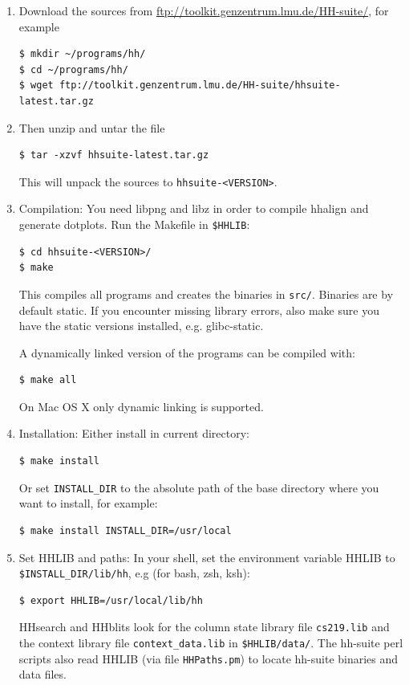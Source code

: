 \documentclass[11pt,a4paper]{article}
\begin{document}
\begin{enumerate}
\item Download the sources from \url{ftp://toolkit.genzentrum.lmu.de/HH-suite/}, for example
\begin{verbatim}
$ mkdir ~/programs/hh/
$ cd ~/programs/hh/
$ wget ftp://toolkit.genzentrum.lmu.de/HH-suite/hhsuite-latest.tar.gz
\end{verbatim}

\item Then unzip and untar the file
\begin{verbatim}
$ tar -xzvf hhsuite-latest.tar.gz
\end{verbatim}
This will unpack the sources to \verb`hhsuite-<VERSION>`.

\item Compilation: You need libpng and libz in order to compile hhalign and generate dotplots. Run the Makefile in \verb`$HHLIB`:
\begin{verbatim}
$ cd hhsuite-<VERSION>/
$ make
\end{verbatim}
This compiles all programs and creates the binaries in \verb`src/`. Binaries are by default static. If you encounter
missing library errors, also make sure you have the static versions installed, e.g. glibc-static.

A dynamically linked version of the programs can be compiled with:
\begin{verbatim}
$ make all
\end{verbatim}
On Mac OS X only dynamic linking is supported.


\item Installation: Either install in current directory:
\begin{verbatim}
$ make install
\end{verbatim}
Or set \verb`INSTALL_DIR` to the absolute path of the base directory where you want to install, for example:
\begin{verbatim}
$ make install INSTALL_DIR=/usr/local
\end{verbatim}

\item Set HHLIB and paths: In your shell, set the environment variable HHLIB to \verb`$INSTALL_DIR/lib/hh`, 
e.g (for bash, zsh, ksh):
\begin{verbatim}
$ export HHLIB=/usr/local/lib/hh
\end{verbatim}
HHsearch and HHblits look for the column state library file \verb`cs219.lib`
and the context library file \verb`context_data.lib` in \verb`$HHLIB/data/`. The hh-suite
perl scripts also read HHLIB (via file \verb`HHPaths.pm`) to locate hh-suite binaries and data files.


\end{enumerate}
\end{document}
